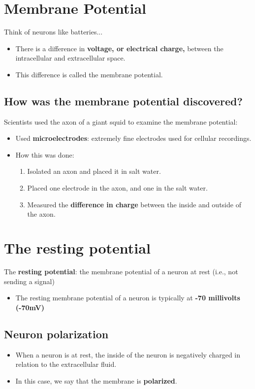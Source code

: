 \documentclass[12pt,a4paper]{article}
\begin{document}
	\section{Membrane Potential}
	
	Think of neurons like batteries...
	\begin{itemize}
		\item There is a difference in \textbf{voltage, or electrical charge,} between the intracellular and extracellular space. 
		\item This difference is called the membrane potential. 
	\end{itemize}
	\subsection{How was the membrane potential discovered?}

	Scientists used the axon of a giant squid to examine the membrane potential:
	\begin{itemize}
		\item Used \textbf{microelectrodes}: extremely fine electrodes used for cellular recordings. 
		\item How this was done:
		\begin{enumerate}
			\item Isolated an axon and placed it in salt water. 
			\item Placed one electrode in the axon, and one in the salt water. 
			\item Measured the \textbf{difference in charge} between the inside and outside of the axon. 
		\end{enumerate}
	\end{itemize}
	
	\section{The resting potential}
	
	The \textbf{resting potential}: the membrane potential of a neuron at rest (i.e., not sending a signal)
	\begin{itemize}
		\item The resting membrane potential of a neuron is typically at \textbf{-70 millivolts (-70mV)}
	\end{itemize}
	
	\subsection{Neuron polarization}
	\begin{itemize}
		\item When a neuron is at rest, the inside of the neuron is negatively charged in relation to the extracellular fluid. 
		\item In this case, we say that the membrane is \textbf{polarized}.
	\end{itemize}
	
\end{document}
